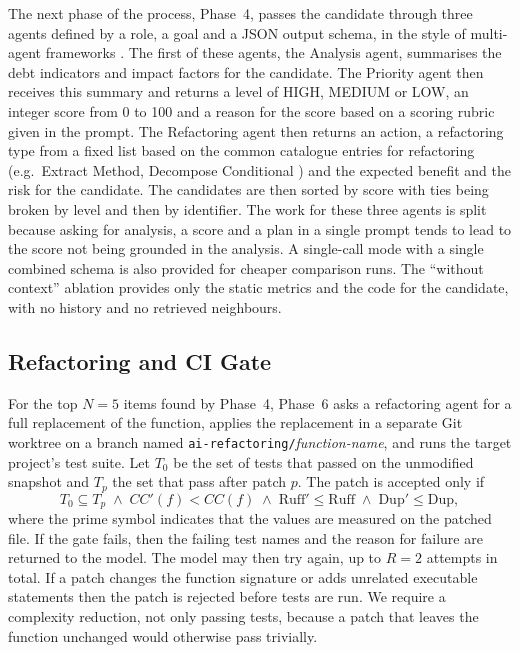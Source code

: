 \documentclass[12pt,onecolumn,draftclsnofoot]{IEEEtran}
\begin{document}
The next phase of the process, Phase~4, passes the candidate through three agents defined by a role, a goal and a JSON output schema, in the style of multi-agent frameworks \cite{wu2024autogen}. The first of these agents, the Analysis agent, summarises the debt indicators and impact factors for the candidate. The Priority agent then receives this summary and returns a level of HIGH, MEDIUM or LOW, an integer score from 0 to 100 and a reason for the score based on a scoring rubric given in the prompt. The Refactoring agent then returns an action, a refactoring type from a fixed list based on the common catalogue entries for refactoring (e.g.\ Extract Method, Decompose Conditional \cite{fowler2018}) and the expected benefit and the risk for the candidate. The candidates are then sorted by score with ties being broken by level and then by identifier. The work for these three agents is split because asking for analysis, a score and a plan in a single prompt tends to lead to the score not being grounded in the analysis. A single-call mode with a single combined schema is also provided for cheaper comparison runs. The ``without context'' ablation provides only the static metrics and the code for the candidate, with no history and no retrieved neighbours.

\subsection{Refactoring and CI Gate}

For the top $N=5$ items found by Phase~4, Phase~6 asks a refactoring agent for a full replacement of the function, applies the replacement in a separate Git worktree on a branch named \texttt{ai-refactoring/}\emph{function-name}, and runs the target project's test suite. Let $T_0$ be the set of tests that passed on the unmodified snapshot and $T_p$ the set that pass after patch $p$. The patch is accepted only if
\begin{equation}
T_0\subseteq T_p \;\wedge\; CC'(f)<CC(f) \;\wedge\; \mathrm{Ruff}'\le\mathrm{Ruff} \;\wedge\; \mathrm{Dup}'\le\mathrm{Dup},
\label{eq:gate}
\end{equation}
where the prime symbol indicates that the values are measured on the patched file. If the gate fails, then the failing test names and the reason for failure are returned to the model. The model may then try again, up to $R=2$ attempts in total. If a patch changes the function signature or adds unrelated executable statements then the patch is rejected before tests are run. We require a complexity reduction, not only passing tests, because a patch that leaves the function unchanged would otherwise pass trivially.
\end{document}
